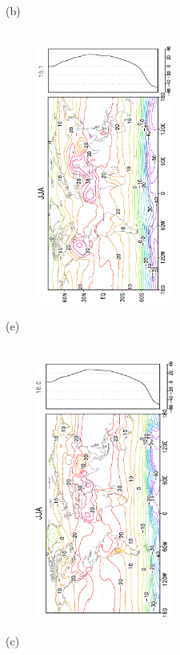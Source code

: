 \documentclass[12pt,a4paper,twoside,openright,headinclude,liststotoc,bibtotoc]{scrreprt}
\begin{document}
\begin{appendix}
\begin{figure}[H]
{}
\parbox{8.5cm}{\hspace{0.5cm}\begin{scriptsize}(b)\end{scriptsize} \vspace{-0.5cm} \\
\includegraphics[height=8.5cm,width=6.5cm,angle=-90]
{eps/zonalcelysmT2m167JJA.eps}
}
\parbox{8.5cm}{\hspace{0.25cm}\begin{scriptsize}(e)\end{scriptsize} \vspace{-0.5cm} \\
\includegraphics[height=8.5cm,width=6.5cm,angle=-90]
{eps/zonalcelt21ysmt2mJJA.eps}
}
\parbox{8.5cm}{\hspace{0.5cm}\begin{scriptsize}(c)\end{scriptsize} \vspace{-0.5cm} \\
}
\end{figure}
\end{appendix}
\end{document}
